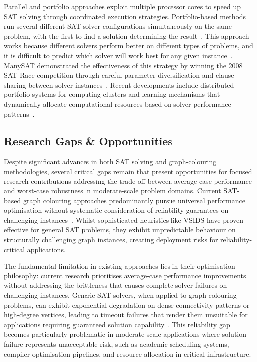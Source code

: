 Parallel and portfolio approaches exploit multiple processor cores to speed up SAT solving through coordinated execution strategies. Portfolio-based methods run several different SAT solver configurations simultaneously on the same problem, with the first to find a solution determining the result~\cite{hamadi2009manysat}. This approach works because different solvers perform better on different types of problems, and it is difficult to predict which solver will work best for any given instance~\cite{balyo2015hordesat}. ManySAT demonstrated the effectiveness of this strategy by winning the 2008 SAT-Race competition through careful parameter diversification and clause sharing between solver instances~\cite{hamadi2009manysat}. Recent developments include distributed portfolio systems for computing clusters and learning mechanisms that dynamically allocate computational resources based on solver performance patterns~\cite{guo2010diversification}.

\subsection{Research Gaps \& Opportunities}

Despite significant advances in both SAT solving and graph-colouring methodologies, several critical gaps remain that present opportunities for focused research contributions addressing the trade-off between average-case performance and worst-case robustness in moderate-scale problem domains. Current SAT-based graph colouring approaches predominantly pursue universal performance optimisation without systematic consideration of reliability guarantees on challenging instances~\cite{hebrard2020constraint}. Whilst sophisticated heuristics like VSIDS have proven effective for general SAT problems, they exhibit unpredictable behaviour on structurally challenging graph instances, creating deployment risks for reliability-critical applications.

The fundamental limitation in existing approaches lies in their optimisation philosophy: current research prioritises average-case performance improvements without addressing the brittleness that causes complete solver failures on challenging instances. Generic SAT solvers, when applied to graph colouring problems, can exhibit exponential degradation on dense connectivity patterns or high-degree vertices, leading to timeout failures that render them unsuitable for applications requiring guaranteed solution capability~\cite{marques2009handbook}. This reliability gap becomes particularly problematic in moderate-scale applications where solution failure represents unacceptable risk, such as academic scheduling systems, compiler optimisation pipelines, and resource allocation in critical infrastructure.

